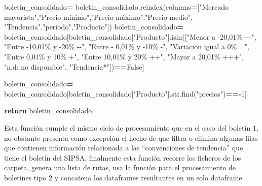 \documentclass[
]{book}
\newenvironment{Shaded}{\begin{snugshade}}{\end{snugshade}}
\newcommand{\BuiltInTok}[1]{#1}
\newcommand{\ControlFlowTok}[1]{\textcolor[rgb]{0.13,0.29,0.53}{\textbf{#1}}}
\newcommand{\DecValTok}[1]{\textcolor[rgb]{0.00,0.00,0.81}{#1}}
\newcommand{\NormalTok}[1]{#1}
\newcommand{\OperatorTok}[1]{\textcolor[rgb]{0.81,0.36,0.00}{\textbf{#1}}}
\newcommand{\StringTok}[1]{\textcolor[rgb]{0.31,0.60,0.02}{#1}}
\newcommand{\VariableTok}[1]{\textcolor[rgb]{0.00,0.00,0.00}{#1}}
\begin{document}
\begin{Shaded}
\begin{Highlighting}[]
\NormalTok{    boletin\_consolidado}\OperatorTok{=}\NormalTok{ boletin\_consolidado.reindex(columns}\OperatorTok{=}\NormalTok{[}\StringTok{"Mercado mayorista"}\NormalTok{,}\StringTok{"Precio mínimo"}\NormalTok{,}\StringTok{"Precio máximo"}\NormalTok{,}\StringTok{"Precio medio"}\NormalTok{,}
                                                              \StringTok{"Tendencia"}\NormalTok{,}\StringTok{"periodo"}\NormalTok{,}\StringTok{"Producto"}\NormalTok{])}
\NormalTok{    boletin\_consolidado}\OperatorTok{=}\NormalTok{ boletin\_consolidado[boletin\_consolidado[}\StringTok{"Producto"}\NormalTok{].isin([}\StringTok{"Menor a {-}20,01\%              {-}{-}{-}"}\NormalTok{,}
                                                                                   \StringTok{"Entre {-}10,01\% y {-}20\%       {-}{-}"}\NormalTok{,}
                                                                                   \StringTok{"Entre {-} 0,01\% y {-}10\%        {-}"}\NormalTok{,}
                                                                                   \StringTok{"Variacion igual a 0\%         ="}\NormalTok{,}
                                                                                   \StringTok{"Entre 0,01\% y 10\%             +"}\NormalTok{,}
                                                                                   \StringTok{"Entre 10,01\% y 20\%           ++"}\NormalTok{,}
                                                                                   \StringTok{"Mayor a 20,01\%                 +++"}\NormalTok{,}
                                                                                   \StringTok{"n.d: no disponible"}\NormalTok{,}
                                                                                    \StringTok{"Tendencia*"}\NormalTok{])}\OperatorTok{==}\VariableTok{False}\NormalTok{]}
    
\NormalTok{    boletin\_consolidado}\OperatorTok{=}\NormalTok{ boletin\_consolidado[boletin\_consolidado[}\StringTok{"Producto"}\NormalTok{].}\BuiltInTok{str}\NormalTok{.find(}\StringTok{"precios"}\NormalTok{)}\OperatorTok{=={-}}\DecValTok{1}\NormalTok{]}
        
    \ControlFlowTok{return}\NormalTok{ boletin\_consolidado}
\end{Highlighting}
\end{Shaded}

Esta función cumple el mismo ciclo de procesamiento que en el caso del boletín 1, no obstante presenta como excepción el hecho de que filtra o elimina algunas filas que contienen información relacionada a las ``convenciones de tendencia'' que tiene el boletín del SIPSA, finalmente esta función recorre los ficheros de los carpeta, genera una lista de rutas, usa la función para el procesamiento de boletines tipo 2 y concatena los dataframes resultantes en un solo dataframe.
\end{document}
